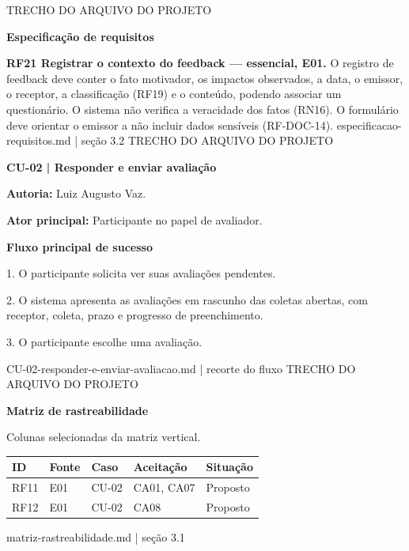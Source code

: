 \documentclass[10pt]{article}
\begin{document}
{\small\color{UFGBlue} TRECHO DO ARQUIVO DO PROJETO}\par
{\large\bfseries Especificação de requisitos}\par
\textbf{RF21 Registrar o contexto do feedback — essencial, E01.} O registro de feedback deve conter o fato motivador, os impactos observados, a data, o emissor, o receptor, a classificação (RF19) e o conteúdo, podendo associar um questionário. O sistema não verifica a veracidade dos fatos (RN16). O formulário deve orientar o emissor a não incluir dados sensíveis (RF-DOC-14).
\vfill
{\scriptsize especificacao-requisitos.md | seção 3.2}
\newpage
{\small\color{UFGBlue} TRECHO DO ARQUIVO DO PROJETO}\par
\begingroup
\fontsize{9}{10.5}\selectfont
\setlength{\parskip}{1.5pt}
{\large\bfseries CU-02 | Responder e enviar avaliação}\par
\textbf{Autoria:} Luiz Augusto Vaz.\par
\textbf{Ator principal:} Participante no papel de avaliador.\par
\textbf{Fluxo principal de sucesso}\par
1. O participante solicita ver suas avaliações pendentes.\par
2. O sistema apresenta as avaliações em rascunho das coletas abertas, com receptor, coleta, prazo e progresso de preenchimento.\par
3. O participante escolhe uma avaliação.\par
\vfill{\scriptsize CU-02-responder-e-enviar-avaliacao.md | recorte do fluxo}
\endgroup
\newpage
{\small\color{UFGBlue} TRECHO DO ARQUIVO DO PROJETO}\par
{\large\bfseries Matriz de rastreabilidade}\par
{\small Colunas selecionadas da matriz vertical.}\par
\small\renewcommand{\arraystretch}{1.4}\begin{tabularx}{\linewidth}{@{}llXll@{}}\toprule ID & Fonte & Caso & Aceitação & Situação\\\midrule
RF11 & E01 & CU-02 & CA01, CA07 & Proposto\\
RF12 & E01 & CU-02 & CA08 & Proposto\\
\bottomrule\end{tabularx}\par\vfill{\scriptsize matriz-rastreabilidade.md | seção 3.1}
\end{document}
